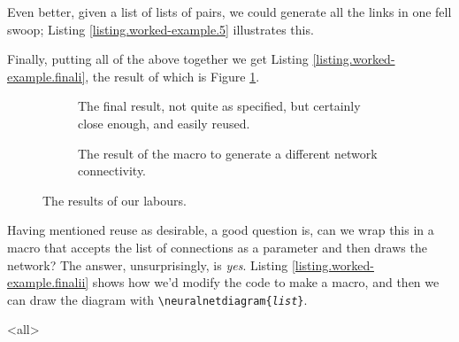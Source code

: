 

Even better, given a list of lists of pairs, we could generate all the links in one fell swoop; Listing \ref{listing.worked-example.5} illustrates this.



Finally, putting all of the above together we get Listing \ref{listing.worked-example.finali}, the result of which is Figure \ref{figure.worked-example.final}.

\begin{figure}[btp]
	\begin{subfigure}{.5\textwidth}
		\centering
		
		\caption{The final result, not quite as specified, but certainly close enough, and easily reused.}
		\label{figure.worked-example.final}
	\end{subfigure}
	\begin{subfigure}{.5\textwidth}
		\centering
		
		\caption{The result of the macro to generate a different network connectivity.}
	\end{subfigure}
	\caption{The results of our labours.}
\end{figure}

Having mentioned reuse as desirable, a good question is, can we wrap this in a macro that accepts the list of connections as a parameter and then draws the network?
The answer, unsurprisingly, is \textit{yes}.
Listing \ref{listing.worked-example.finalii} shows how we'd modify the code to make a macro, and then we can draw the diagram with \texttt{\textbackslash neuralnetdiagram\{\textit{list}\}}.




\mode<all>	%
